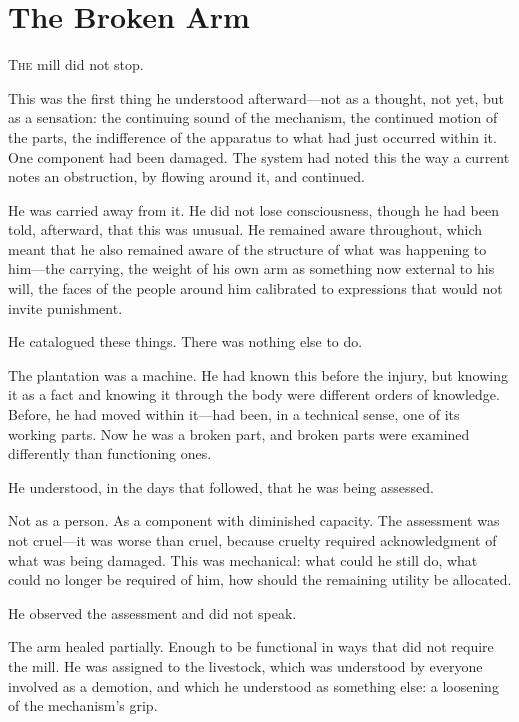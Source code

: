 
\chapter{The Broken Arm}


\lettrine{T}{he} mill did not stop.

This was the first thing he understood afterward---not as a
thought, not yet, but as a sensation: the continuing sound of
the mechanism, the continued motion of the parts, the
indifference of the apparatus to what had just occurred within
it. One component had been damaged. The system had noted this
the way a current notes an obstruction, by flowing around it,
and continued.

He was carried away from it. He did not lose consciousness,
though he had been told, afterward, that this was unusual.
He remained aware throughout, which meant that he also remained
aware of the structure of what was happening to him---the
carrying, the weight of his own arm as something now external
to his will, the faces of the people around him calibrated to
expressions that would not invite punishment.

He catalogued these things. There was nothing else to do.

The plantation was a machine. He had known this before the
injury, but knowing it as a fact and knowing it through the
body were different orders of knowledge. Before, he had moved
within it---had been, in a technical sense, one of its working
parts. Now he was a broken part, and broken parts were examined
differently than functioning ones.

He understood, in the days that followed, that he was being
assessed.

Not as a person. As a component with diminished capacity.
The assessment was not cruel---it was worse than cruel, because
cruelty required acknowledgment of what was being damaged.
This was mechanical: what could he still do, what could no
longer be required of him, how should the remaining utility
be allocated.

He observed the assessment and did not speak.

\scenebreak

The arm healed partially. Enough to be functional in ways that
did not require the mill. He was assigned to the livestock,
which was understood by everyone involved as a demotion, and
which he understood as something else: a loosening of the
mechanism's grip.


